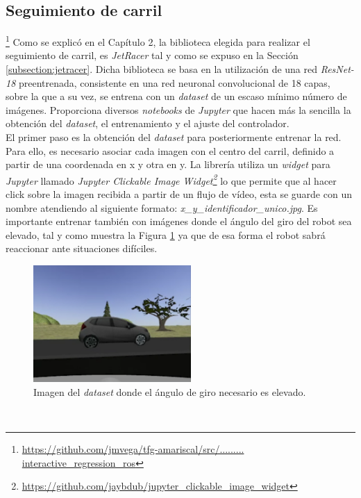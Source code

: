 \subsection{Seguimiento de carril}
\label{subsection:lanefollower}
\footnote{\url{https://github.com/jmvega/tfg-amariscal/src/......... interactive_regression_ros}}
Como se explicó en el Capítulo 2, la biblioteca elegida para realizar el seguimiento de carril, es \textit{JetRacer} tal y como se expuso en la Sección \ref{subsection:jetracer}. Dicha biblioteca se basa en la utilización de una red \textit{ResNet-18} preentrenada, consistente en una red neuronal convolucional de 18 capas, sobre la que a su vez, se entrena con un \textit{dataset} de un escaso mínimo número de imágenes. Proporciona diversos \textit{notebooks} de \textit{Jupyter} que hacen más la sencilla la obtención del \textit{dataset}, el entrenamiento y el ajuste del controlador.\\

El primer paso es la obtención del \textit{dataset} para posteriormente entrenar la red. Para ello, es necesario asociar cada imagen con el centro del carril, definido a partir de una coordenada en x y otra en y. La librería utiliza un \textit{widget} para \textit{Jupyter} llamado \textit{Jupyter Clickable Image Widget\footnote{\url{https://github.com/jaybdub/jupyter_clickable_image_widget}}} lo que permite que al hacer click sobre la imagen recibida a partir de un flujo de vídeo, esta se guarde con un nombre atendiendo al siguiente formato: \textit{x\_y\_identificador\_unico.jpg}. Es importante entrenar también con imágenes donde el ángulo del giro del robot sea elevado, tal y como muestra la Figura \ref{fig:traineddifficult} ya que de esa forma el robot sabrá reaccionar ante situaciones difíciles.\\

\begin{figure} [h!]
	\begin{center}
		\includegraphics[width=6cm]{figs/trainedDifficult}
	\end{center}
	\caption{Imagen del \textit{dataset} donde el ángulo de giro necesario es elevado.}
	\label{fig:traineddifficult}
\end{figure}\

